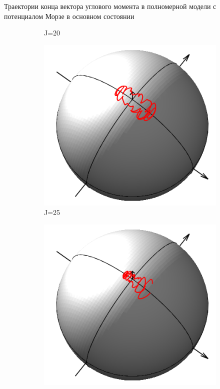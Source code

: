\documentclass[hyperref={pdfpagelabels=false},usepdftitle=false, xcolor = dvipsnames]{beamer}
\begin{document}
\begin{frame}{\small Траектории конца вектора углового момента в полномерной модели с потенциалом Морзе в основном состоянии}
\begin{block}{}
\begin{figure}
\begin{subfigure}{0.25\textwidth}
	    \caption{J=20}
	  \end{subfigure}
	  \begin{subfigure}{0.25\textwidth}
	    \includegraphics[width = \linewidth]{../pictures/MorseGroundState00/plot_J=25.png}
	    \caption{J=25}
	  \end{subfigure}
	  \begin{subfigure}{0.25\textwidth}
	    \includegraphics[width = \linewidth]{../pictures/MorseGroundState00/plot_J=28.png}

\end{subfigure}
\end{figure}
\end{block}
\end{frame}
\end{document}
